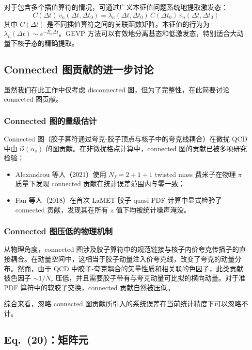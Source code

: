 \documentclass[11pt,a4paper]{ctexart}
\newcommand{\order}[1]{\mathcal{O}(#1)}
\begin{document}
对于包含多个插值算符的情况，可通过广义本征值问题系统地提取激发态：
\begin{equation}
C(\Delta t) \, v_n(\Delta t, \Delta t_0) = \lambda_n(\Delta t, \Delta t_0) \, C(\Delta t_0) \, v_n(\Delta t, \Delta t_0)
\end{equation}
其中 $C(\Delta t)$ 是不同插值算符之间的关联函数矩阵。本征值的行为为 $\lambda_n(\Delta t) \sim e^{-E_n \Delta t}$。GEVP 方法可以有效地分离基态和低激发态，特别适合大动量下核子态的精确提取。

\subsection{Connected 图贡献的进一步讨论}

虽然我们在此工作中仅考虑 disconnected 图，但为了完整性，在此简要讨论 connected 图贡献。

\subsubsection{Connected 图的量级估计}

Connected 图（胶子算符通过夸克-胶子顶点与核子中的夸克线耦合）在微扰 QCD 中由 $\order{\alpha_s}$ 的图贡献。在非微扰格点计算中，connected 图的贡献已被多项研究检验：
\begin{itemize}
  \item Alexandrou 等人（2021）使用 $N_f=2+1+1$ twisted mass 费米子在物理 $\pi$ 质量下发现 connected 贡献在统计误差范围内与零一致；
  \item Fan 等人（2018）在首次 LaMET 胶子 quasi-PDF 计算中显式检验了 connected 贡献，发现其在所有 $z$ 值下均被统计噪声淹没。
\end{itemize}

\subsubsection{Connected 图压低的物理机制}

从物理角度，connected 图涉及胶子算符中的规范链接与核子内价夸克传播子的直接耦合。在动量空间中，这相当于胶子动量注入价夸克线，改变了夸克的动量分布。然而，由于 QCD 中胶子-夸克耦合的矢量性质和相关联的色因子，此类贡献被色因子 $\sim 1/N_c$ 压低，并且需要胶子带有与夸克动量可比拟的横向动量。对于准 PDF 算符中的软胶子交换，connected 贡献自然被压低。

综合来看，忽略 connected 图贡献所引入的系统误差在当前统计精度下可以忽略不计。

\subsection{Eq.~(20)：矩阵元}
\end{document}
